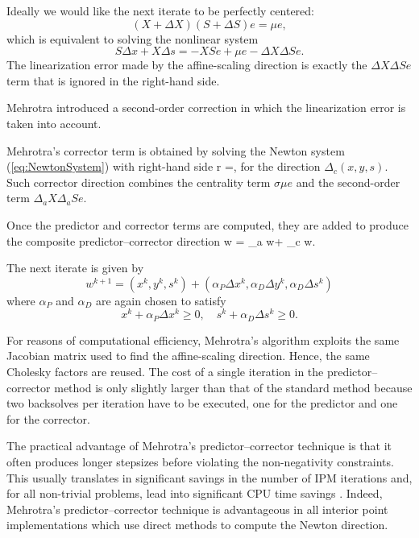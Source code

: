 Ideally we would like the next iterate to be perfectly centered: 
\[
  (X+\Delta X)(S+\Delta S)e=\mu e,
\]
which is equivalent to solving the nonlinear system
\[
  S\Delta x + X\Delta s = -XSe +\mu e - \Delta X\Delta Se.
\]
The linearization error made by the affine-scaling direction is exactly 
the $\Delta X\Delta Se$ term that is ignored in the right-hand side.


Mehrotra introduced a second-order correction in which the 
linearization error is taken into account. 

Mehrotra's corrector term is obtained by solving the Newton system 
(\ref{eq:NewtonSystem}) with right-hand side
\be \label{MehrotraRhs}
r =,
\ee
for the direction $\Delta_c (x,y,s)$.
Such corrector direction combines the centrality term $\sigma \mu e$
and the second-order term $\Delta_a X\Delta_a Se$.

Once the predictor and corrector terms are computed, they are 
added to produce the composite predictor--corrector direction
\be \label{eq:CompositeDirection}
\Delta w = \Delta_a w+ \Delta_c w.
\ee

The next iterate is given by
\[
w^{k+1} = (x^k,y^k,s^k)
        + (\alpha_P\Delta x^k,\alpha_D\Delta y^k,\alpha_D\Delta s^k)
\]
where $\alpha_P$ and $\alpha_D$ are again chosen to satisfy
\[
x^k+\alpha_P\Delta x^k \ge 0, \quad s^k+\alpha_D\Delta s^k \ge 0.
\]

For reasons of computational efficiency, Mehrotra's algorithm exploits 
the same Jacobian matrix used to find the affine-scaling direction. 
Hence, the same Cholesky factors are reused.
The cost of a single iteration in the predictor--corrector 
method is only slightly larger than that of the standard 
method because two backsolves per iteration have to be executed, 
one for the predictor and one for the corrector. 

The practical advantage of Mehrotra's predictor--corrector technique
is that it often produces longer stepsizes before violating the 
non-negativity constraints.
%
This usually translates in significant savings in the number of IPM 
iterations and, for all non-trivial problems, lead into significant 
CPU time savings \cite{LustigMarstenShanno,Mehrotra92}. Indeed, 
Mehrotra's predictor--corrector technique is advantageous in all 
interior point implementations which use direct methods to compute 
the Newton direction.

